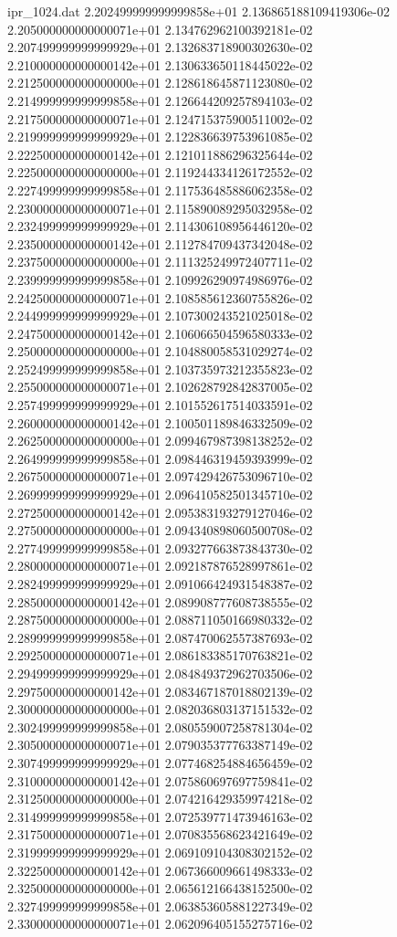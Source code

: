 \begin{filecontents}{ipr_1024.dat}
2.202499999999999858e+01 2.136865188109419306e-02
2.205000000000000071e+01 2.134762962100392181e-02
2.207499999999999929e+01 2.132683718900302630e-02
2.210000000000000142e+01 2.130633650118445022e-02
2.212500000000000000e+01 2.128618645871123080e-02
2.214999999999999858e+01 2.126644209257894103e-02
2.217500000000000071e+01 2.124715375900511002e-02
2.219999999999999929e+01 2.122836639753961085e-02
2.222500000000000142e+01 2.121011886296325644e-02
2.225000000000000000e+01 2.119244334126172552e-02
2.227499999999999858e+01 2.117536485886062358e-02
2.230000000000000071e+01 2.115890089295032958e-02
2.232499999999999929e+01 2.114306108956446120e-02
2.235000000000000142e+01 2.112784709437342048e-02
2.237500000000000000e+01 2.111325249972407711e-02
2.239999999999999858e+01 2.109926290974986976e-02
2.242500000000000071e+01 2.108585612360755826e-02
2.244999999999999929e+01 2.107300243521025018e-02
2.247500000000000142e+01 2.106066504596580333e-02
2.250000000000000000e+01 2.104880058531029274e-02
2.252499999999999858e+01 2.103735973212355823e-02
2.255000000000000071e+01 2.102628792842837005e-02
2.257499999999999929e+01 2.101552617514033591e-02
2.260000000000000142e+01 2.100501189846332509e-02
2.262500000000000000e+01 2.099467987398138252e-02
2.264999999999999858e+01 2.098446319459393999e-02
2.267500000000000071e+01 2.097429426753096710e-02
2.269999999999999929e+01 2.096410582501345710e-02
2.272500000000000142e+01 2.095383193279127046e-02
2.275000000000000000e+01 2.094340898060500708e-02
2.277499999999999858e+01 2.093277663873843730e-02
2.280000000000000071e+01 2.092187876528997861e-02
2.282499999999999929e+01 2.091066424931548387e-02
2.285000000000000142e+01 2.089908777608738555e-02
2.287500000000000000e+01 2.088711050166980332e-02
2.289999999999999858e+01 2.087470062557387693e-02
2.292500000000000071e+01 2.086183385170763821e-02
2.294999999999999929e+01 2.084849372962703506e-02
2.297500000000000142e+01 2.083467187018802139e-02
2.300000000000000000e+01 2.082036803137151532e-02
2.302499999999999858e+01 2.080559007258781304e-02
2.305000000000000071e+01 2.079035377763387149e-02
2.307499999999999929e+01 2.077468254884656459e-02
2.310000000000000142e+01 2.075860697697759841e-02
2.312500000000000000e+01 2.074216429359974218e-02
2.314999999999999858e+01 2.072539771473946163e-02
2.317500000000000071e+01 2.070835568623421649e-02
2.319999999999999929e+01 2.069109104308302152e-02
2.322500000000000142e+01 2.067366009661498333e-02
2.325000000000000000e+01 2.065612166438152500e-02
2.327499999999999858e+01 2.063853605881227349e-02
2.330000000000000071e+01 2.062096405155275716e-02

\end{filecontents}
